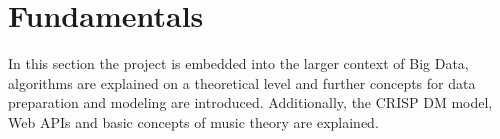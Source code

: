 \newpage
\section{Fundamentals}

In this section the project is embedded into the larger context of Big Data, algorithms are explained on a theoretical level and further concepts for data preparation and modeling are introduced.
Additionally, the \ac{CRISP DM} model, Web APIs and basic concepts of music theory are explained.